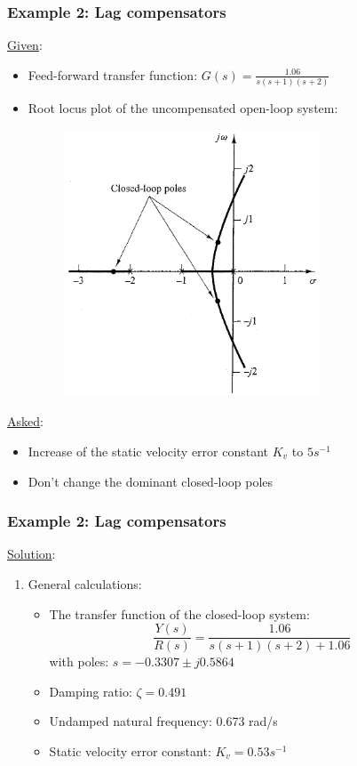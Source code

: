 \begin{frame}
	\frametitle{Example 2: Lag compensators}
	\underline{Given}:
	\begin{itemize}
		\item Feed-forward transfer function: $G(s)=\frac{1.06}{s(s+1)(s+2)}$
		\item Root locus plot of the uncompensated open-loop system:
		\begin{figure}
			\centering
			\includegraphics[width=0.3\linewidth]{Ex2_rootlocus}
		\end{figure}
	\end{itemize}
	\underline{Asked}:
	\begin{itemize}
		\item Increase of the static velocity error constant $K_v$ to $5s^{-1}$
		\item Don't change the dominant closed-loop poles
	\end{itemize}
\end{frame}

\begin{frame}
	\frametitle{Example 2: Lag compensators}
	\underline{Solution}:
	\begin{enumerate}
		\item General calculations:
		\begin{itemize}
			\item The transfer function of the closed-loop system:
			$$\frac{Y(s)}{R(s)}=\frac{1.06}{s(s+1)(s+2)+1.06}$$ with poles: $s=-0.3307\pm j0.5864$
			\item Damping ratio: $\zeta=0.491$
			\item Undamped natural frequency: 0.673 rad/s
			\item Static velocity error constant: $K_v=0.53s^{-1}$
		\end{itemize}
	\end{enumerate}
\end{frame}

